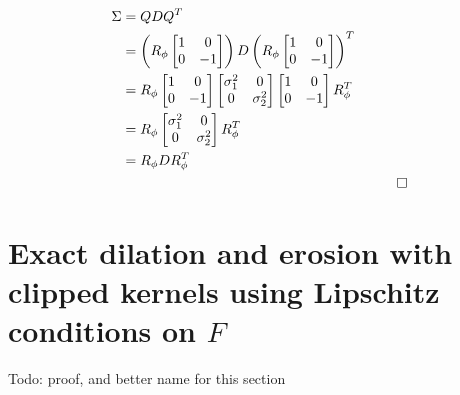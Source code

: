 \documentclass[a4paper, 12pt]{report}
\def\comment#1{\color{red}#1\color{black}}
\begin{document}
\begin{align}
	\Sigma&=QDQ^T \\
	&= \left(R_\phi \begin{bmatrix}
		1  &  0  \\
		0  &  -1
	\end{bmatrix}\right)D\left(R_\phi \begin{bmatrix}
		1  &  0  \\
		0  &  -1
	\end{bmatrix}\right)^T \\
	&= R_\phi \begin{bmatrix}
		1  &  0  \\
		0  &  -1
	\end{bmatrix} \begin{bmatrix}
		\sigma_1^2  &  0  \\
		0  &  \sigma_2^2
	\end{bmatrix} \begin{bmatrix}
		1  &  0  \\
		0  &  -1
	\end{bmatrix} R_\phi^T \\
	&= R_\phi \begin{bmatrix}
		\sigma_1^2  &  0  \\
		0  &  \sigma_2^2
	\end{bmatrix} R_\phi^T \\
	&= R_\phi D R_\phi^T \\&&\qed\nonumber
\end{align}
\newpage
\section{Exact dilation and erosion with clipped kernels using Lipschitz conditions on $F$}
\label{sec:lipschitz}
\comment{Todo: proof, and better name for this section}

\newpage
\end{document}
